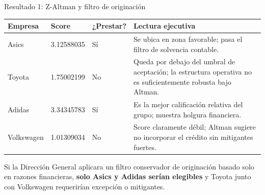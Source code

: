 \documentclass[aspectratio=169,10pt]{beamer}
\newcommand{\smallhead}[1]{\vspace{0.08cm}{\color{udlapblue}\textbf{#1}}\par\vspace{0.02cm}}
\begin{document}
\begin{frame}{Resultado 1: Z-Altman y filtro de originación}
\footnotesize
\centering
\begin{tabular}{L{2.3cm}C{2.0cm}C{2.0cm}L{5.1cm}}
\toprule
{}
\textbf{Empresa} & \textbf{Score} & \textbf{¿Prestar?} & \textbf{Lectura ejecutiva} \\
\midrule
Asics & 3.12588035 & Sí & Se ubica en zona favorable; pasa el filtro de solvencia contable. \\
Toyota & 1.75002199 & No & Queda por debajo del umbral de aceptación; la estructura operativa no es suficientemente robusta bajo Altman. \\
Adidas & 3.34345783 & Sí & Es la mejor calificación relativa del grupo; muestra holgura financiera. \\
Volkswagen & 1.01309034 & No & Score claramente débil; Altman sugiere no incorporar el crédito sin mitigantes fuertes. \\
\bottomrule
\end{tabular}

\vspace{0.25cm}
\smallhead{Implicación}
Si la Dirección General aplicara un filtro conservador de originación basado solo en razones financieras,
\textbf{solo Asics y Adidas serían elegibles} y Toyota junto con Volkswagen requerirían excepción o mitigantes.
\end{frame}
\end{document}
